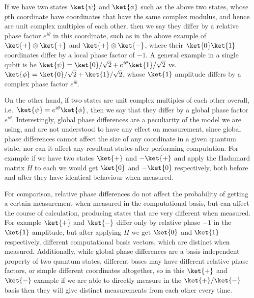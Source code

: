 If we have two states $\ket{\psi}$ and $\ket{\phi}$ such as the above two states, whose $p$th coordinate have coordinates that have the same complex modulus, and hence are unit complex multiples of each other, then we say they differ by a relative phase factor $e^{i\theta}$ in this coordinate, such as in the above example of $\ket{+}\otimes \ket{+}$ and $\ket{+}\otimes \ket{-}$, where their $\ket{0}\ket{1}$ coordinates differ by a local phase factor of $-1$. A general example in a single qubit is be $\ket{\psi} = \ket{0}/\sqrt{2} + e^{i\theta}\ket{1}/\sqrt{2}$ vs. $\ket{\phi} = \ket{0}/\sqrt{2} + \ket{1}/\sqrt{2}$, whose $\ket{1}$ amplitude differs by a complex phase factor $e^{i\theta}$.

On the other hand, if two states are unit complex multiples of each other overall, i.e.\ $\ket{\psi} = e^{i\theta}\ket{\phi}$, then we say that they differ by a global phase factor $e^{i\theta}$. Interestingly, global phase differences are a peculiarity of the model we are using, and are not understood to have any effect on measurement, since global phase differences cannot affect the size of any coordinate in  a given quantum state, nor can it affect any resultant states after performing computation. For example if we have two states $\ket{+}$ and $-\ket{+}$ and apply the Hadamard matrix $H$ to each we would get $\ket{0}$ and $-\ket{0}$ respectively, both before and after they have identical behaviour when measured.

For comparison, relative phase differences do not affect the probability of getting a certain measurement when measured in the computational basis, but can affect the course of calculation, producing states that are very different when measured. For example $\ket{+}$ and $\ket{-}$ differ only by relative phase $-1$ in the $\ket{1}$ amplitude, but after applying $H$ we get $\ket{0}$ and $\ket{1}$ respectively, different computational basis vectors, which are distinct when measured. Additionally, while global phase differences are a basis independent property of two quantum states, different bases may have different relative phase factors, or simple different coordinates altogether, so in this $\ket{+}$ and $\ket{-}$ example if we are able to directly measure in the $\ket{+}/\ket{-}$ basis then they will give distinct measurements from each other every time.

